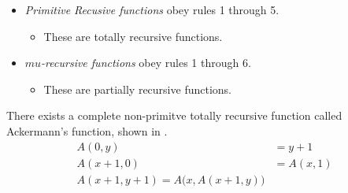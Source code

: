 \begin{itemize}[noitemsep]
\item \emph{Primitive Recusive functions} obey rules 1 through 5.
  \begin{itemize}[noitemsep]
  \item These are totally recursive functions.
  \end{itemize}
\item \emph{$mu$-recursive functions} obey rules 1 through 6.
  \begin{itemize}[noitemsep]
  \item These are partially recursive functions.
  \end{itemize}
\end{itemize}

There exists a complete non-primitve totally recursive function called Ackermann's function, shown in .
\begin{equation}\label{eq:Ackermanns_Function}
  \begin{aligned}
    A(0, y) &= y+1 \\
    A(x+1, 0) &= A(x, 1) \\
    A(x+1, y+1) = A \bigl( x, A(x+1, y) \bigr) \\
  \end{aligned}
\end{equation}

